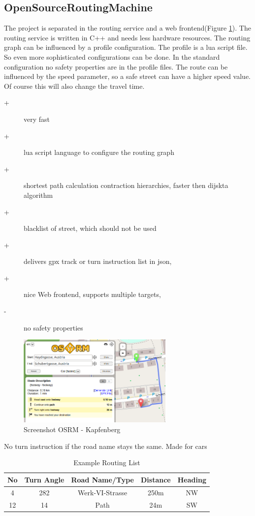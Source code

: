\documentclass{sig-alternate}
\begin{document}



\subsection{OpenSourceRoutingMachine}
The project is separated in the routing service and a web frontend(Figure \ref{fig:osrm}). The routing service is written in C++ and needs less hardware resources. The routing graph can be influenced by a profile configuration. The profile is a lua script file. So even more sophisticated configurations can be done. In the standard configuration no safety properties are in the profile files. The route can be influenced by the speed parameter, so a safe street can have a higher speed value. Of course this will also change the travel time. \\
\begin{description}
\item[+]very fast\cite{luxen-vetter-2011}
\item[+]lua script language to configure the routing graph 
\item[+]shortest path calculation contraction hierarchies, faster then dijskta algorithm
\item[+]blacklist of street, which should not be used
\item[+]delivers gpx track or turn instruction list in json,
\item[+]nice Web frontend, supports multiple targets,
\item[-]no safety properties
\end{description}

\begin{figure}
\centering
\includegraphics[width=3in]{osrm-ss.png}
\caption{Screenshot OSRM - Kapfenberg}
\label{fig:osrm}
\end{figure}
No turn instruction if the road name stays the same. Made for cars


\begin{table}
\centering
\caption{Example Routing List}
\begin{tabular}{|c|c|c|c|c|} \hline
No&Turn Angle&Road Name/Type&Distance&Heading\\ \hline
4&282&Werk-VI-Strasse&250m&NW\\ \hline
12&14&Path&24m&SW\\ \hline
\end{tabular}
\end{table}
\end{document}
